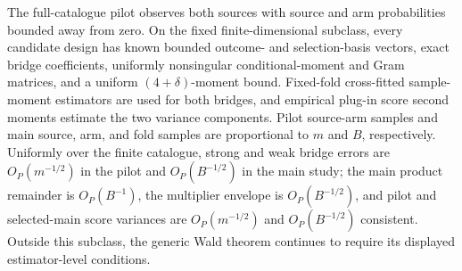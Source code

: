The full-catalogue pilot observes both sources with source and arm probabilities bounded away from zero.  On the fixed finite-dimensional subclass, every candidate design has known bounded outcome- and selection-basis vectors, exact bridge coefficients, uniformly nonsingular conditional-moment and Gram matrices, and a uniform \((4+\delta)\)-moment bound.  Fixed-fold cross-fitted sample-moment estimators are used for both bridges, and empirical plug-in score second moments estimate the two variance components.  Pilot source-arm samples and main source, arm, and fold samples are proportional to \(m\) and \(B\), respectively.  Uniformly over the finite catalogue, strong and weak bridge errors are \(O_P(m^{-1/2})\) in the pilot and \(O_P(B^{-1/2})\) in the main study; the main product remainder is \(O_P(B^{-1})\), the multiplier envelope is \(O_P(B^{-1/2})\), and pilot and selected-main score variances are \(O_P(m^{-1/2})\) and \(O_P(B^{-1/2})\) consistent.  Outside this subclass, the generic Wald theorem continues to require its displayed estimator-level conditions.